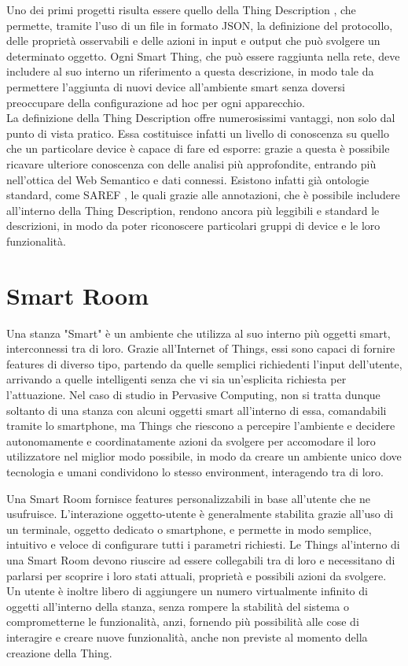 \documentclass[12pt,a4paper,openright,oneside]{report}
\begin{document}
Uno dei primi progetti risulta essere quello della Thing Description \cite{td}, che permette, tramite l'uso di un file in formato JSON, la definizione del protocollo, delle proprietà osservabili e delle azioni in input e output che può svolgere un determinato oggetto. Ogni Smart Thing, che può essere raggiunta nella rete, deve includere al suo interno un riferimento a questa descrizione, in modo tale da permettere l'aggiunta di nuovi device all'ambiente smart senza doversi preoccupare della configurazione ad hoc per ogni apparecchio.\\

La definizione della Thing Description offre numerosissimi vantaggi, non solo dal punto di vista pratico. Essa costituisce infatti un livello di conoscenza su quello che un particolare device è capace di fare ed esporre: grazie a questa è possibile ricavare ulteriore conoscenza con delle analisi più approfondite, entrando più nell'ottica del Web Semantico e dati connessi. Esistono infatti già ontologie standard, come SAREF \cite{saref}, le quali grazie alle annotazioni, che è possibile includere all'interno della Thing Description, rendono ancora più leggibili e standard le descrizioni, in modo da poter riconoscere particolari gruppi di device e le loro funzionalità.\\


\section{Smart Room}
Una stanza "Smart" \cite{smartroom} è un ambiente che utilizza al suo interno più oggetti smart, interconnessi tra di loro. Grazie all'Internet of Things, essi sono capaci di fornire features di diverso tipo, partendo da quelle semplici richiedenti l'input dell'utente, arrivando a quelle intelligenti senza che vi sia un'esplicita richiesta per l'attuazione. Nel caso di studio in Pervasive Computing, non si tratta dunque soltanto di una stanza con alcuni oggetti smart all'interno di essa, comandabili tramite lo smartphone, ma Things che riescono a percepire l'ambiente e decidere autonomamente e coordinatamente azioni da svolgere per accomodare il loro utilizzatore nel miglior modo possibile, in modo da creare un ambiente unico dove tecnologia e umani condividono lo stesso environment, interagendo tra di loro.

Una Smart Room fornisce features personalizzabili in base all'utente che ne usufruisce. L'interazione oggetto-utente è generalmente stabilita grazie all'uso di un terminale, oggetto dedicato o smartphone, e permette in modo semplice, intuitivo e veloce di configurare tutti i parametri richiesti. Le Things al'interno di una Smart Room devono riuscire ad essere collegabili tra di loro e necessitano di parlarsi per scoprire i loro stati attuali, proprietà e possibili azioni da svolgere. Un utente è inoltre libero di aggiungere un numero virtualmente infinito di oggetti all'interno della stanza, senza rompere la stabilità del sistema o comprometterne le funzionalità, anzi, fornendo più possibilità alle cose di interagire e creare nuove funzionalità, anche non previste al momento della creazione della Thing.
\end{document}
